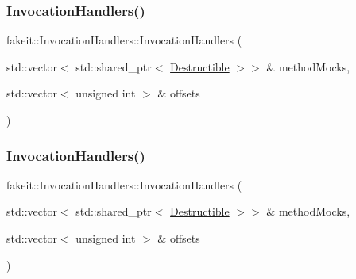 \subsubsection{\texorpdfstring{InvocationHandlers()}{InvocationHandlers()}\hspace{0.1cm}{\footnotesize\ttfamily [5/9]}}
{\footnotesize\ttfamily fakeit\+::\+Invocation\+Handlers\+::\+Invocation\+Handlers (\begin{DoxyParamCaption}\item[{std\+::vector$<$ std\+::shared\+\_\+ptr$<$ \mbox{\hyperlink{classfakeit_1_1Destructible}{Destructible}} $>$$>$ \&}]{method\+Mocks,  }\item[{std\+::vector$<$ unsigned int $>$ \&}]{offsets }\end{DoxyParamCaption})\hspace{0.3cm}{\ttfamily [inline]}}

\mbox{\label{classfakeit_1_1InvocationHandlers_a2fd61aecd4f313aa0ca83b2ab438eeef}} 
\subsubsection{\texorpdfstring{InvocationHandlers()}{InvocationHandlers()}\hspace{0.1cm}{\footnotesize\ttfamily [6/9]}}
{\footnotesize\ttfamily fakeit\+::\+Invocation\+Handlers\+::\+Invocation\+Handlers (\begin{DoxyParamCaption}\item[{std\+::vector$<$ std\+::shared\+\_\+ptr$<$ \mbox{\hyperlink{classfakeit_1_1Destructible}{Destructible}} $>$$>$ \&}]{method\+Mocks,  }\item[{std\+::vector$<$ unsigned int $>$ \&}]{offsets }\end{DoxyParamCaption})\hspace{0.3cm}{\ttfamily [inline]}}

\mbox{\label{classfakeit_1_1InvocationHandlers_a2fd61aecd4f313aa0ca83b2ab438eeef}} 

